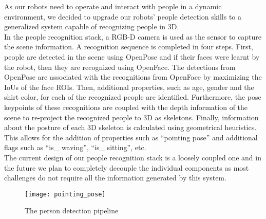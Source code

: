 As our robots need to operate and interact with people in a dynamic environment, we decided to upgrade our robots’ people detection skills to a generalized system capable of recognizing people in 3D. 
\\
In the people recognition stack, a RGB-D camera is used as the sensor to capture the scene information. A recognition sequence is completed in four steps. First, people are detected in the scene using OpenPose and if their faces were learnt by the robot, then they are recognized using OpenFace. The detections from OpenPose are associated with the recognitions from OpenFace by maximizing the IoUs of the face ROIs. Then, additional properties, such as age, gender and the shirt color, for each of the recognized people are identified. Furthermore, the pose keypoints of these recognitions are coupled with the depth information of the scene to re-project the recognized people to 3D as skeletons. Finally, information about the posture of each 3D skeleton is calculated using geometrical heuristics. This allows for the addition of properties such as “pointing pose” and additional flags such as “is\_ waving”, “is\_ sitting”, etc.
\\
The current design of our people recognition stack is a loosely coupled one and in the future we plan to completely decouple the individual components as most challenges do not require all the information generated by this system.

\begin{figure}[H]
	\centering
    \texttt{[image: pointing\_pose]}
	\caption{The person detection pipeline}
	\label{fig:people_recognition}
\end{figure}
